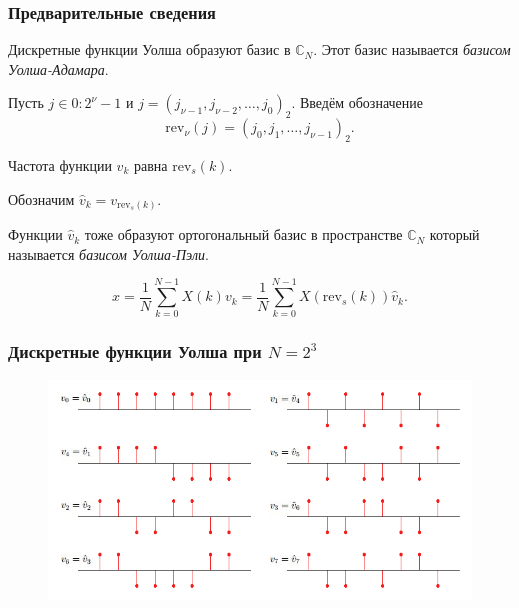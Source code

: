 \documentclass[notes=only]{beamer}
\begin{document}
\begin{frame}\frametitle{Предварительные сведения}
Дискретные функции Уолша образуют базис в $\mathbb{C}_N$. 
Этот базис называется \emph{базисом Уолша-Адамара}.

Пусть $j \in 0:2^\nu - 1$ и $j=(j_{\nu-1}, j_{\nu-2}, \ldots, j_0)_2$.
Введём обозначение  
\[
  \mathrm{rev}_\nu(j) = (j_0, j_1, \ldots, j_{\nu-1})_2.
\]

Частота функции $v_k$ равна $\mathrm{rev}_s(k)$. 

Обозначим
$\hat{v}_k = v_{\mathrm{rev}_s(k)}$. 

Функции $\hat{v}_k$ тоже образуют
ортогональный базис
в пространстве $\mathbb{C}_N$ который называется \emph{базисом Уолша-Пэли}.

\begin{equation}
  x = \frac{1}{N} \sum_{k=0}^{N-1} X(k) v_k = 
  \frac{1}{N} \sum_{k=0}^{N-1} X(\mathrm{rev}_s(k)) \hat{v}_k.
\end{equation}

\end{frame}
    
  
\begin{frame}\frametitle{Дискретные функции Уолша при $N=2^3$}
\begin{figure}
    \centering
    \includegraphics[width=\textwidth]{../images/walsh.png}
\end{figure}

\end{frame}
    
\end{document}
